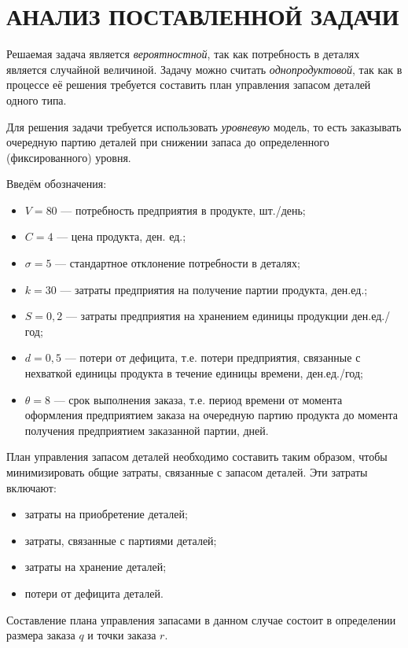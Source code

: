 \section{АНАЛИЗ ПОСТАВЛЕННОЙ ЗАДАЧИ}

Решаемая задача является \textit{вероятностной}, так как потребность в
деталях является случайной величиной.
Задачу можно считать \textit{однопродуктовой}, так как в процессе её решения
требуется составить план управления запасом деталей одного типа.

Для решения задачи требуется использовать \textit{уровневую} модель, то есть
заказывать очередную партию деталей при снижении запаса до определенного
(фиксированного) уровня.

Введём обозначения:
\begin{itemize}
  \item $V=80$ --- потребность предприятия в продукте, шт./день;
  \item $C=4$ --- цена продукта, ден. ед.;
  \item $\sigma=5$ --- стандартное отклонение потребности в деталях;
  \item $k=30$ --- затраты предприятия на получение партии продукта, ден.ед.;
  \item $S=0{,}2$ --- затраты предприятия на хранением единицы продукции ден.ед./год;
  \item $d=0{,}5$ --- потери от дефицита, т.е. потери предприятия, связанные с нехваткой
    единицы продукта в течение единицы времени, ден.ед./год;
  \item $\theta=8$ --- срок выполнения заказа, т.е. период времени от момента
    оформления предприятием заказа на очередную партию продукта
    до момента получения предприятием заказанной партии, дней.
\end{itemize}

План управления запасом деталей необходимо составить таким образом,
чтобы минимизировать общие затраты, связанные с запасом деталей.
Эти затраты включают:
\begin{itemize}
  \item затраты на приобретение деталей;
  \item затраты, связанные с партиями деталей;
  \item затраты на хранение деталей;
  \item потери от дефицита деталей.
\end{itemize}

Составление плана управления запасами в данном случае состоит в определении
размера заказа $q$ и точки заказа $r$.

